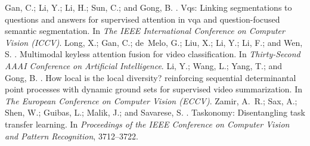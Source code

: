 \documentclass[letterpaper]{article} \usepackage{aaai19}  \usepackage{times}  \usepackage{helvet}  \usepackage{courier}  \usepackage{url}  \usepackage{graphicx}  \usepackage{amssymb}
\begin{document}
\begin{thebibliography}{}
Gan, C.; Li, Y.; Li, H.; Sun, C.; and Gong, B.
.
\newblock Vqs: Linking segmentations to questions and answers for supervised
  attention in vqa and question-focused semantic segmentation.
\newblock In {\em The IEEE International Conference on Computer Vision (ICCV)}.
Long, X.; Gan, C.; de~Melo, G.; Liu, X.; Li, Y.; Li, F.; and Wen, S.
.
\newblock Multimodal keyless attention fusion for video classification.
\newblock In {\em Thirty-Second AAAI Conference on Artificial Intelligence}.
Li, Y.; Wang, L.; Yang, T.; and Gong, B.
.
\newblock How local is the local diversity? reinforcing sequential
  determinantal point processes with dynamic ground sets for supervised video
  summarization.
\newblock In {\em The European Conference on Computer Vision (ECCV)}.
Zamir, A.~R.; Sax, A.; Shen, W.; Guibas, L.; Malik, J.; and Savarese, S.
.
\newblock Taskonomy: Disentangling task transfer learning.
\newblock In {\em Proceedings of the IEEE Conference on Computer Vision and
  Pattern Recognition},  3712--3722.

\end{thebibliography}
\end{document}
